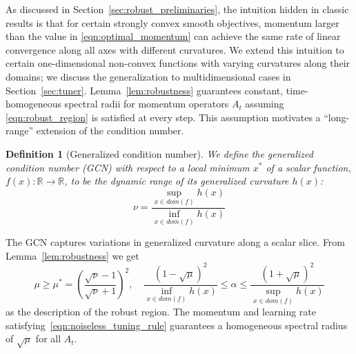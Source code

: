 \documentclass{article} %
\newtheorem{definition}[theorem]{Definition}
\newcommand{\mat}[1]{\bm{\mathit{#1}}}
\begin{document}
As discussed in Section~\ref{sec:robust_preliminaries}, the intuition hidden in classic results
is that for certain strongly convex smooth objectives, momentum larger than the value in \eqref{eqn:optimal_momentum} can achieve the same rate of linear convergence along all axes with different curvatures. 
We extend this intuition to certain one-dimensional non-convex functions with varying curvatures along their domains; we discuss the generalization to multidimensional cases in Section~\ref{sec:tuner}.
Lemma~\ref{lem:robustness} guarantees constant, time-homogeneous spectral radii for momentum operators $\mat{A}_t$ 
assuming \eqref{eqn:robust_region} is satisfied at every step. 
This assumption motivates a ``long-range'' extension of the condition number.
\begin{definition}[Generalized condition number]
We define the generalized condition number (GCN) with respect to a local minimum $x^*$ of a scalar function, $f(x):\mathbb{R}\rightarrow \mathbb{R}$, to be the dynamic range of its generalized curvature $h(x)$:
\begin{equation}
	\nu = \frac{\sup_{x \in dom(f)} h(x)}{ \inf_{x \in dom(f)} h(x)}
\end{equation}
\end{definition}
The GCN captures variations in generalized curvature along a scalar slice.
From Lemma~\ref{lem:robustness} we get
\begin{equation}
	\mu \geq \mu^* = \left(\frac{\sqrt{\nu}-1}{\sqrt{\nu}+1}\right)^2,
	\quad
	\frac{(1-\sqrt{\mu})^2}{\inf_{x \in dom(f)}h(x)} \leq \alpha \leq \frac{(1+\sqrt{\mu})^2}{\sup_{x \in dom(f)}h(x)}
	\label{eqn:noiseless_tuning_rule}
\end{equation}
as the description of the robust region. The momentum and learning rate satisfying~\eqref{eqn:noiseless_tuning_rule} guarantees a homogeneous spectral radius of $\sqrt{\mu}$ for all $\mat{A}_t$.
\end{document}
